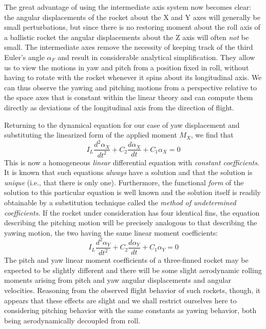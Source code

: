 The great advantage of using the intermediate axis system now becomes clear:
the angular displacements of the rocket about the X and Y axes will generally
be small perturbations, but since there is no restoring moment about the roll
axis of a ballistic rocket the angular displacements about the Z axis will
often \emph{not} be small. The intermediate axes remove the necessity of
keeping track of the third Euler's angle $\alpha_F$ and result in considerable
analytical simplification. They allow us to view the motions in yaw and pitch
from a position fixed in roll, without having to rotate with the rocket
whenever it spins about its longitudinal axis. We can thus observe the yawing
and pitching motions from a perspective relative to the space axes that is
constant within the linear theory and can compute them directly as deviations
of the longitudinal axis from the direction of flight.

Returning to the dynamical equation for our case of yaw displacement and
substituting the linearized form of the applied moment $M_X$, we find that
\begin{equation}\label{ch2:eq:10}
I_L \frac{d^{2}\alpha_X}{dt^{2}} + C_2 \frac{d\alpha_X}{dt} + C_1\alpha_X = 0
\end{equation}
This is now a homogeneous \emph{linear} differential equation with
\emph{constant coefficients}. It is known that such equations \emph{always}
have a solution and that the solution is \emph{unique} (i.e., that there is
only one). Furthermore, the functional \emph{form} of the solution to this
particular equation is well known and the solution itself is readily
obtainable by a substitution technique called the \emph{method of undetermined
coefficients}. If the rocket under consideration has four identical fins, the
equation describing the pitching motion will be precisely analogous to that
describing the yawing motion, the two having the same linear moment
coefficients:
\begin{equation*}
I_L \frac{d^{2}\alpha_Y}{dt^{2}} + C_2 \frac{d\alpha_Y}{dt} + C_1\alpha_Y = 0
\end{equation*}
The pitch and yaw linear moment coefficients of a three-finned rocket may be
expected to be slightly different and there will be some slight aerodynamic
rolling moments arising from pitch and yaw angular displacements and angular
velocities. Reasoning from the observed flight behavior of such rockets,
though, it appears that these effects are slight and we shall restrict
ourselves here to considering pitching behavior with the same constants as
yawing behavior, both being aerodynamically decoupled from roll.

